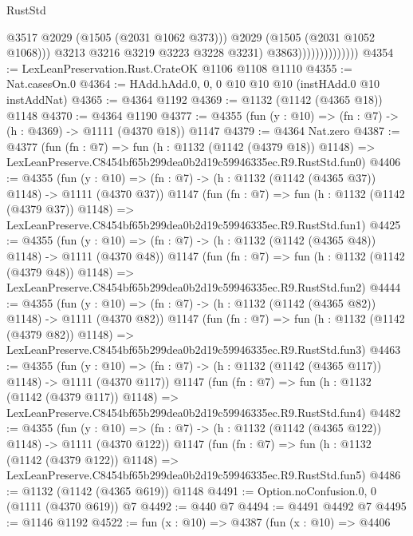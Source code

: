 \begin{lexlean}{RustStd}
\begin{coremodule}
                                      @3517
                                      @2029
                                      (@1505 (@2031 @1062 @373)))
                                    @2029
                                    (@1505 (@2031 @1052 @1068)))
                                  @3213
                                  @3216
                                  @3219
                                  @3223
                                  @3228
                                  @3231)
                                @3863))))))))))))))
@4354 := LexLeanPreservation.Rust.CrateOK @1106 @1108 @1110
@4355 := Nat.casesOn.{0}
@4364 := HAdd.hAdd.{0, 0, 0} @10 @10 @10 (instHAdd.{0} @10 instAddNat)
@4365 := @4364 @1192
@4369 := @1132 (@1142 (@4365 @18)) @1148
@4370 := @4364 @1190
@4377 := @4355 (fun (y : @10) => (fn : @7) -> (h : @4369) -> @1111 (@4370 @18)) @1147
@4379 := @4364 Nat.zero
@4387 := @4377
    (fun (fn : @7) =>
    fun (h : @1132 (@1142 (@4379 @18)) @1148) =>
    LexLeanPreserve.C8454bf65b299dea0b2d19c59946335ec.R9.RustStd.fun0)
@4406 := @4355
    (fun (y : @10) => (fn : @7) -> (h : @1132 (@1142 (@4365 @37)) @1148) -> @1111 (@4370 @37))
    @1147
    (fun (fn : @7) =>
    fun (h : @1132 (@1142 (@4379 @37)) @1148) =>
    LexLeanPreserve.C8454bf65b299dea0b2d19c59946335ec.R9.RustStd.fun1)
@4425 := @4355
    (fun (y : @10) => (fn : @7) -> (h : @1132 (@1142 (@4365 @48)) @1148) -> @1111 (@4370 @48))
    @1147
    (fun (fn : @7) =>
    fun (h : @1132 (@1142 (@4379 @48)) @1148) =>
    LexLeanPreserve.C8454bf65b299dea0b2d19c59946335ec.R9.RustStd.fun2)
@4444 := @4355
    (fun (y : @10) => (fn : @7) -> (h : @1132 (@1142 (@4365 @82)) @1148) -> @1111 (@4370 @82))
    @1147
    (fun (fn : @7) =>
    fun (h : @1132 (@1142 (@4379 @82)) @1148) =>
    LexLeanPreserve.C8454bf65b299dea0b2d19c59946335ec.R9.RustStd.fun3)
@4463 := @4355
    (fun (y : @10) => (fn : @7) -> (h : @1132 (@1142 (@4365 @117)) @1148) -> @1111 (@4370 @117))
    @1147
    (fun (fn : @7) =>
    fun (h : @1132 (@1142 (@4379 @117)) @1148) =>
    LexLeanPreserve.C8454bf65b299dea0b2d19c59946335ec.R9.RustStd.fun4)
@4482 := @4355
    (fun (y : @10) => (fn : @7) -> (h : @1132 (@1142 (@4365 @122)) @1148) -> @1111 (@4370 @122))
    @1147
    (fun (fn : @7) =>
    fun (h : @1132 (@1142 (@4379 @122)) @1148) =>
    LexLeanPreserve.C8454bf65b299dea0b2d19c59946335ec.R9.RustStd.fun5)
@4486 := @1132 (@1142 (@4365 @619)) @1148
@4491 := Option.noConfusion.{0, 0} (@1111 (@4370 @619)) @7
@4492 := @440 @7
@4494 := @4491 @4492 @7
@4495 := @1146 @1192
@4522 := fun (x : @10) =>
  @4387
    (fun (x : @10) =>
    @4406

\end{coremodule}
\end{lexlean}
